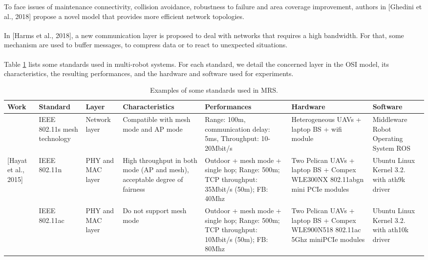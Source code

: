 \documentclass[11pt,openany]{book}
\begin{document}
To face issues of maintenance connectivity, collision avoidance, robustness to failure and area coverage improvement, authors in [Ghedini et al., 2018] propose a novel model that provides more eﬃcient network topologies.\\\\
In [Harms et al., 2018], a new communication layer is proposed to deal with networks that requires a high bandwidth. For that, some mechanism are used to buﬀer messages, to compress data or to react to unexpected situations.\\\\
Table \ref{tab:4.3} lists some standards used in multi-robot systems. For each standard, we detail the concerned layer in the OSI model, its characteristics, the resulting performances, and the hardware and software used for experiments.
\begin{landscape}
    \begin{table}[H]
        \centering
        \caption{Examples of some standards used in MRS.}
        \label{tab:4.3}
        \begin{tabular}{|p{1.5cm}|p{1.7cm}|p{1.3cm}|p{2.9cm}|p{2.7cm}|p{2.3cm}|p{2cm}|}\hline
            \textbf{Work}                             & \textbf{Standard}            & \textbf{Layer}    & \textbf{Characteristics}                                                  & \textbf{Performances}                                                                    & \textbf{Hardware}                                                               & \textbf{Software}
            \\\hline
            [Scherer et al., 2015]                    & IEEE 802.11s mesh technology & Network layer     & Compatible with mesh mode and AP mode                                     & Range: 100m, communication delay: 5ms, Throughput: 10-20Mbit/s                           & Heterogeneous UAVs + laptop BS + wifi module                                    & Middleware Robot Operating System ROS       \\\hline
            \multirow{2}{1.5cm}{[Hayat et al., 2015]} & IEEE 802.11n                 & PHY and MAC layer & High throughput in both mode (AP and mesh), acceptable degree of fairness & Outdoor + mesh mode + single hop; Range: 500m; TCP throughput: 35Mbit/s (50m); FB: 40Mhz & Two Pelican UAVs + laptop BS + Compex WLE300NX 802.11abgn mini PCIe modules     & Ubuntu Linux Kernel 3.2. with ath9k driver  \\\cline{2-7}
                                                      & IEEE 802.11ac                & PHY and MAC layer & Do not support mesh mode                                                  & Outdoor + mesh mode + single hop; Range: 500m; TCP throughput: 10Mbit/s (50m); FB: 80Mhz & Two Pelican UAVs + laptop BS + Compex WLE900N518 802.11ac 5Ghz miniPCIe modules & Ubuntu Linux Kernel 3.2. with ath10k driver \\\hline
        \end{tabular}
    \end{table}
\end{landscape}
\end{document}
